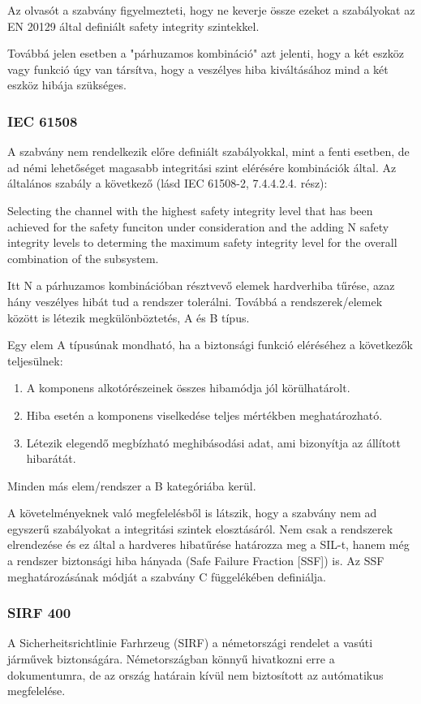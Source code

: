 Az olvasót a szabvány figyelmezteti, hogy ne keverje össze ezeket a szabályokat az EN 20129\cite{EN50129} által definiált safety integrity szintekkel.

Továbbá jelen esetben a "párhuzamos kombináció" azt jelenti, hogy a két eszköz vagy funkció úgy van társítva, hogy a veszélyes hiba kiváltásához mind a két eszköz hibája szükséges.

\subsubsection{IEC 61508}
A szabvány nem rendelkezik előre definiált szabályokkal, mint a fenti esetben, de ad némi lehetőséget magasabb integritási szint elérésére kombinációk által.
Az általános szabály a következő (lásd IEC 61508-2, 7.4.4.2.4. rész):
\begin{center}
	Selecting the channel with the highest safety integrity level that has been achieved for the safety funciton under consideration and the adding N safety integrity levels to determing the maximum safety integrity level for the overall combination of the subsystem.
\end{center}

Itt N a párhuzamos kombinációban résztvevő elemek hardverhiba tűrése, azaz hány veszélyes hibát tud a rendszer tolerálni.
Továbbá a rendszerek/elemek között is létezik megkülönböztetés, A és B típus. 

Egy elem A típusúnak mondható, ha a biztonsági funkció eléréséhez a következők teljesülnek:
\begin{enumerate}
	\item A komponens alkotórészeinek összes hibamódja jól körülhatárolt.
	\item Hiba esetén a komponens viselkedése teljes mértékben meghatározható.
	\item Létezik elegendő megbízható meghibásodási adat, ami bizonyítja az állított hibarátát.
\end{enumerate}
Minden más elem/rendszer a B kategóriába kerül.

A követelményeknek való megfelelésből is látszik, hogy a szabvány nem ad egyszerű szabályokat a integritási szintek elosztásáról. 
Nem csak a rendszerek elrendezése és ez által a hardveres hibatűrése határozza meg a SIL-t, hanem még a rendszer biztonsági hiba hányada (Safe Failure Fraction [SSF]) is.
Az SSF meghatározásának módját a szabvány C függelékében definiálja.

\subsubsection{SIRF 400}
A Sicherheitsrichtlinie Farhrzeug (SIRF) a németországi rendelet a vasúti járművek biztonságára. 
Németországban könnyű hivatkozni erre a dokumentumra, de az ország határain kívül nem biztosított az autómatikus megfelelése.

